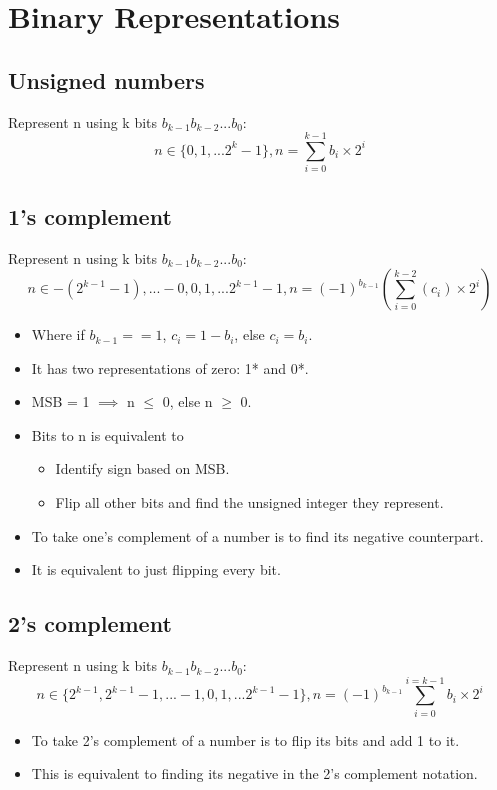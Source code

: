 \documentclass{report}
\begin{document}
\section{Binary Representations}
\subsection{Unsigned numbers}
Represent n using k bits $b_{k-1}b_{k-2}...b_0$:
\begin{equation}
n \in \{0,1,...2^{k}-1\}, n = \sum_{i=0}^{k-1}b_i\times2^{i}
\end{equation}
\subsection{1's complement}
Represent n using k bits $b_{k-1}b_{k-2}...b_0$:
\begin{equation}
n \in {-(2^{k-1}-1),...-0,0,1,...2^{k-1}-1}, n = (-1)^{b_{k-1}}(\sum_{i=0}^{k-2} (c_i) \times 2^{i})
\end{equation} 
\begin{itemize}
\item Where if $b_{k-1}==1$, $c_i=1-b_i$, else $c_i=b_i$.
\item It has two representations of zero: 1* and 0*.
\item MSB = 1 $\implies$ n $\leq$ 0, else n $\geq$ 0.
\item Bits to n is equivalent to 
\begin{itemize}
    \item Identify sign based on MSB.
    \item Flip all other bits and find the unsigned integer they represent.
\end{itemize}
\item To take one's complement of a number is to find its negative counterpart.
\item It is equivalent to just flipping every bit.
\end{itemize}
\subsection{2's complement}
Represent n using k bits $b_{k-1}b_{k-2}...b_0$:
\begin{equation}
n \in \{2^{k-1}, 2^{k-1}-1, ... -1,0,1,...2^{k-1}-1\}, n = (-1)^{b_{k-1}}\sum_{i=0}^{i=k-1} b_i \times 2^i
\end{equation}
\begin{itemize}
\item To take 2's complement of a number is to flip its bits and add 1 to it.
\item This is equivalent to finding its negative in the 2's complement notation.
\end{itemize}
\end{document}
